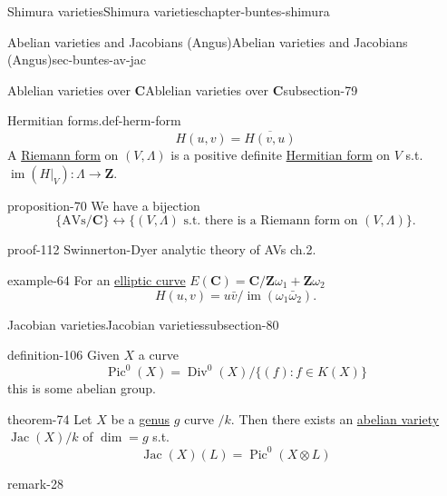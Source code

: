 \documentclass[oneside,10pt,]{book}
\numberwithin{equation}{section}
\newcommand{\ZZ}{\mathbf{Z}}
\newcommand{\CC}{\mathbf{C}}
\DeclareMathOperator{\divisors}{Div}
\DeclareMathOperator{\Pic}{Pic}
\DeclareMathOperator{\Jac}{Jac}
\DeclareMathOperator{\im}{im}
\begin{document}
\begin{chapterptx}{Shimura varieties}{}{Shimura varieties}{}{}{chapter-buntes-shimura}
\begin{sectionptx}{Abelian varieties and Jacobians (Angus)}{}{Abelian varieties and Jacobians (Angus)}{}{}{sec-buntes-av-jac}
\begin{subsectionptx}{Ablelian varieties over \(\CC\)}{}{Ablelian varieties over \(\CC\)}{}{}{subsection-79}
\begin{definition}{Hermitian forms.}{def-herm-form}
\begin{equation*}
H(u,v) = \overline{H(v,u)}
\end{equation*}
A \hyperref[def-riemann-form]{Riemann form} on \((V,\Lambda)\) is a positive definite \hyperref[def-herm-form]{Hermitian form} on \(V\) s.t. \(\im(H|_V) \colon \Lambda \to \ZZ\).%
\end{definition}
\begin{proposition}{}{}{proposition-70}%
\hypertarget{p-1099}{}%
We have a bijection%
\begin{equation*}
\{\text{AVs}/\CC\} \leftrightarrow \{(V,\Lambda)\text{ s.t. there is a Riemann form on } (V, \Lambda)\}\text{.}
\end{equation*}
%
\end{proposition}
\begin{proofptx}{}{proof-112}
\hypertarget{p-1100}{}%
Swinnerton-Dyer analytic theory of AVs ch.2.%
\end{proofptx}
\begin{example}{}{example-64}%
\hypertarget{p-1101}{}%
For an \hyperref[def-supersing-isog-ec]{elliptic curve} \(E(\CC) = \CC/ \ZZ \omega_1 + \ZZ \omega_2\)%
\begin{equation*}
H(u,v) = u\bar v/ \im(\omega_1 \bar \omega_2)\text{.}
\end{equation*}
%
\end{example}
\end{subsectionptx}
%
%
\typeout{************************************************}
\typeout{************************************************}
%
\begin{subsectionptx}{Jacobian varieties}{}{Jacobian varieties}{}{}{subsection-80}
\begin{definition}{}{definition-106}%
\hypertarget{p-1102}{}%
Given \(X\) a curve%
\begin{equation*}
\Pic^0(X) = \divisors^0(X)/\{(f) : f \in K(X)\}
\end{equation*}
this is some abelian group.%
\end{definition}
\begin{theorem}{}{}{theorem-74}%
\hypertarget{p-1103}{}%
Let \(X\) be a \hyperref[def-class-set]{genus} \(g\) curve \(/k\). Then there exists an \hyperref[def-buntes-abvar]{abelian variety} \(\Jac(X)/k\) of \(\dim = g\) s.t.%
\begin{equation*}
\Jac(X)(L) = \Pic^0(X\otimes L)
\end{equation*}
%
\end{theorem}
\begin{remark}{}{remark-28}%

\end{remark}
\end{subsectionptx}
\end{sectionptx}
\end{chapterptx}
\end{document}
